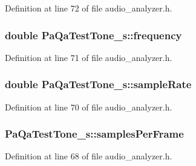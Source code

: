 Definition at line 72 of file audio\+\_\+analyzer.\+h.

\subsubsection[{\texorpdfstring{frequency}{frequency}}]{\setlength{\rightskip}{0pt plus 5cm}double Pa\+Qa\+Test\+Tone\+\_\+s\+::frequency}\hypertarget{struct_pa_qa_test_tone__s_ab6e6a027870ba348bbce705bf5c196e5}{}\label{struct_pa_qa_test_tone__s_ab6e6a027870ba348bbce705bf5c196e5}


Definition at line 71 of file audio\+\_\+analyzer.\+h.

\subsubsection[{\texorpdfstring{sample\+Rate}{sampleRate}}]{\setlength{\rightskip}{0pt plus 5cm}double Pa\+Qa\+Test\+Tone\+\_\+s\+::sample\+Rate}\hypertarget{struct_pa_qa_test_tone__s_a204af537989a744626b4aabeb9e2d3a9}{}\label{struct_pa_qa_test_tone__s_a204af537989a744626b4aabeb9e2d3a9}


Definition at line 70 of file audio\+\_\+analyzer.\+h.

\subsubsection[{\texorpdfstring{samples\+Per\+Frame}{samplesPerFrame}}]{ Pa\+Qa\+Test\+Tone\+\_\+s\+::samples\+Per\+Frame}\hypertarget{struct_pa_qa_test_tone__s_a90c802d23c98b9b340772c2bf2c14a84}{}\label{struct_pa_qa_test_tone__s_a90c802d23c98b9b340772c2bf2c14a84}


Definition at line 68 of file audio\+\_\+analyzer.\+h.

